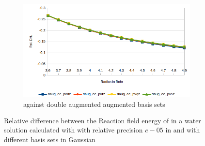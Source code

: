 \documentclass[../Thesis.tex]{subfiles}
\begin{document}
\begin{figure}[h!]
\begin{subfigure}[b]{0.75\linewidth}
    \includegraphics[width=\linewidth]{img/watdaugreldiff.png}
    \caption{\mrchem against double augmented augmented basis sets}
  \end{subfigure}
  \caption[Relative difference between methods for ]{Relative difference between the Reaction field energy of  in a water solution calculated with with relative precision $e-05$ in \mrchem
   and with different basis sets in Gaussian}
  \label{fig:watreldiffvar}
\end{figure}
\end{document}
